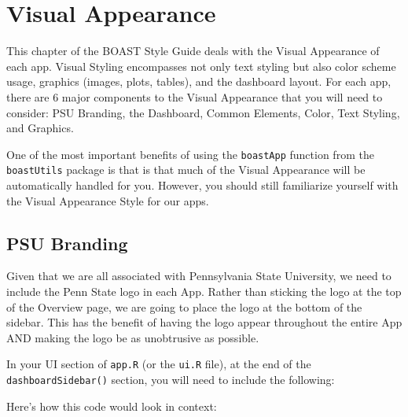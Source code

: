 \documentclass[
]{book}
\newenvironment{Shaded}{\begin{snugshade}}{\end{snugshade}}
\newcommand{\DataTypeTok}[1]{\textcolor[rgb]{0.13,0.29,0.53}{#1}}
\newcommand{\KeywordTok}[1]{\textcolor[rgb]{0.13,0.29,0.53}{\textbf{#1}}}
\newcommand{\NormalTok}[1]{#1}
\newcommand{\OperatorTok}[1]{\textcolor[rgb]{0.81,0.36,0.00}{\textbf{#1}}}
\newcommand{\StringTok}[1]{\textcolor[rgb]{0.31,0.60,0.02}{#1}}
\begin{document}
\hypertarget{visualAppearance}{%
\chapter{Visual Appearance}\label{visualAppearance}}

This chapter of the BOAST Style Guide deals with the Visual Appearance of each app. Visual Styling encompasses not only text styling but also color scheme usage, graphics (images, plots, tables), and the dashboard layout. For each app, there are 6 major components to the Visual Appearance that you will need to consider: PSU Branding, the Dashboard, Common Elements, Color, Text Styling, and Graphics.

One of the most important benefits of using the \texttt{boastApp} function from the \texttt{boastUtils} package is that is that much of the Visual Appearance will be automatically handled for you. However, you should still familiarize yourself with the Visual Appearance Style for our apps.

\hypertarget{logo}{%
\section{PSU Branding}\label{logo}}

Given that we are all associated with Pennsylvania State University, we need to include the Penn State logo in each App. Rather than sticking the logo at the top of the Overview page, we are going to place the logo at the bottom of the sidebar. This has the benefit of having the logo appear throughout the entire App AND making the logo be as unobtrusive as possible.

In your UI section of \texttt{app.R} (or the \texttt{ui.R} file), at the end of the \texttt{dashboardSidebar()} section, you will need to include the following:

\begin{Shaded}
\end{Shaded}

Here's how this code would look in context:
\end{document}
